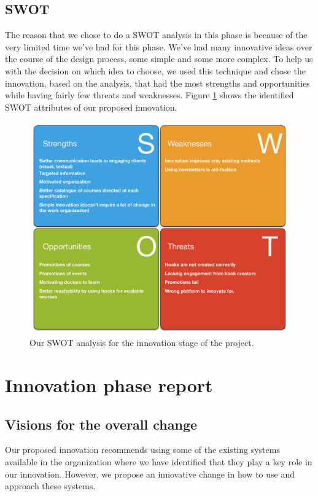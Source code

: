 \subsection{SWOT}
The reason that we chose to do a SWOT analysis in this phase is because of the very limited time we've had for this phase. We've had many innovative ideas over the course of the design process, some simple and some more complex. To help us with the decision on which idea to choose, we used this technique and chose the innovation, based on the analysis, that had the most strengths and opportunities while having fairly few threats and weaknesses. Figure \ref{fig:swot} shows the identified SWOT attributes of our proposed innovation.

\begin{figure}[h!]
 \begin{center}
  \includegraphics[width=1\textwidth]{figures/swot.pdf}
  \caption{Our SWOT analysis for the innovation stage of the project.\label{fig:swot}}
 \end{center}
\end{figure}

\section{Innovation phase report}

\subsection{Visions for the overall change}
Our proposed innovation recommends using some of the existing systems available in the organization where we have identified that they play a key role in our innovation. However, we propose an innovative change in how to use and approach these systems.

